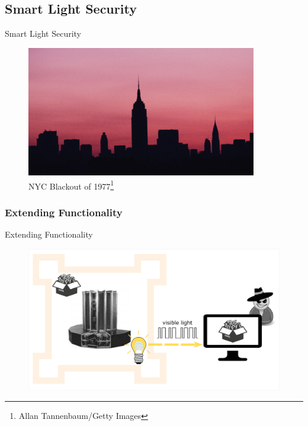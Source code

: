 \documentclass[11pt,t,usepdftitle=false,aspectratio=169]{beamer}
\begin{document}
\subsection{Smart Light Security} %
\label{sub:smart_light_security}
\begin{frame}{Smart Light Security} %
	\begin{figure} %
		\centering
		\includegraphics[height=5.7cm,keepaspectratio]{img/nyc-blackout.jpg}
		\caption{\small{NYC Blackout of 1977}\setcounter{footnote}{2}\footnote[frame]{\tiny{Allan Tannenbaum/Getty Images}}}
	\end{figure}
\end{frame}

\subsubsection{Extending Functionality} %
\label{subsub:extending}
\begin{frame}{Extending Functionality} %
	\begin{figure}
		\centering
		\includegraphics{img/extended-func-attack-light.png}
	\end{figure}
\end{frame}
\end{document}
